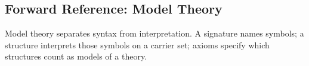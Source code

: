 \subsection*{Forward Reference: Model Theory}
\label{subsec:forward-reference-model-theory}

\begin{remark*}[Exposition]
Model theory separates syntax from interpretation.  A signature names symbols;
a structure interprets those symbols on a carrier set; axioms specify which
structures count as models of a theory.
\end{remark*}

